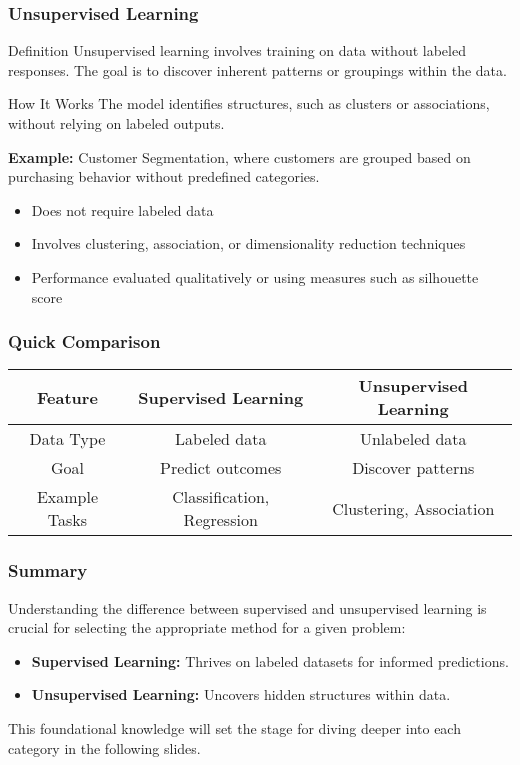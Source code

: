\documentclass[aspectratio=169]{beamer}
\begin{document}
\begin{frame}[fragile]
    \frametitle{Unsupervised Learning}
    \begin{block}{Definition}
        Unsupervised learning involves training on data without labeled responses. The goal is to discover inherent patterns or groupings within the data.
    \end{block}
    
    \begin{block}{How It Works}
        The model identifies structures, such as clusters or associations, without relying on labeled outputs.
    \end{block}

    \begin{example}
        \textbf{Example:} 
        Customer Segmentation, where customers are grouped based on purchasing behavior without predefined categories.
    \end{example}

    \begin{itemize}
        \item Does not require labeled data
        \item Involves clustering, association, or dimensionality reduction techniques
        \item Performance evaluated qualitatively or using measures such as silhouette score
    \end{itemize}
\end{frame}

\begin{frame}[fragile]
    \frametitle{Quick Comparison}
    \begin{center}
        \begin{tabular}{|c|c|c|}
            \hline
            \textbf{Feature} & \textbf{Supervised Learning} & \textbf{Unsupervised Learning} \\
            \hline
            Data Type & Labeled data & Unlabeled data \\
            \hline
            Goal & Predict outcomes & Discover patterns \\
            \hline
            Example Tasks & Classification, Regression & Clustering, Association \\
            \hline
        \end{tabular}
    \end{center}
\end{frame}

\begin{frame}[fragile]
    \frametitle{Summary}
    Understanding the difference between supervised and unsupervised learning is crucial for selecting the appropriate method for a given problem:
    \begin{itemize}
        \item \textbf{Supervised Learning:} Thrives on labeled datasets for informed predictions.
        \item \textbf{Unsupervised Learning:} Uncovers hidden structures within data.
    \end{itemize}
    This foundational knowledge will set the stage for diving deeper into each category in the following slides.
\end{frame}
\end{document}
